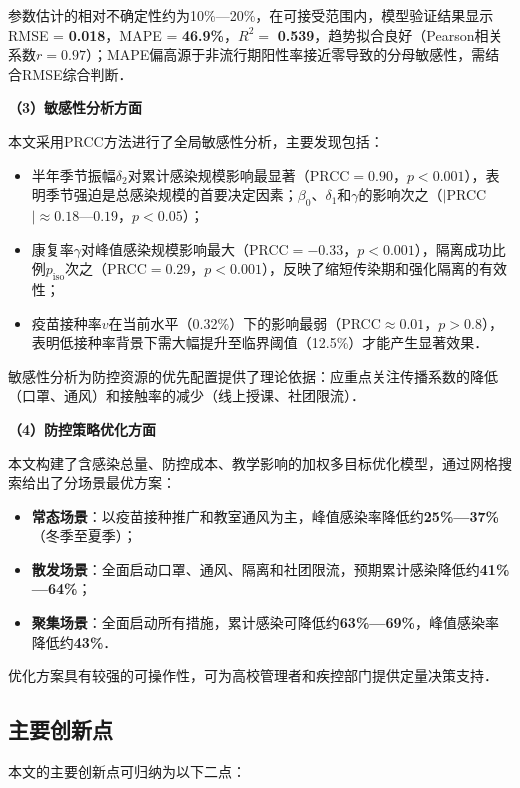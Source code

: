 参数估计的相对不确定性约为10\%—20\%，在可接受范围内，模型验证结果显示RMSE = \textbf{0.018}，MAPE = \textbf{46.9\%}，$R^2 =$ \textbf{0.539}，趋势拟合良好（Pearson相关系数$r=0.97$）；MAPE偏高源于非流行期阳性率接近零导致的分母敏感性，需结合RMSE综合判断．

\textbf{（3）敏感性分析方面}

本文采用PRCC方法进行了全局敏感性分析，主要发现包括：

\begin{itemize}
  \item 半年季节振幅$\delta_2$对累计感染规模影响最显著（PRCC$=0.90$，$p<0.001$），表明季节强迫是总感染规模的首要决定因素；$\beta_0$、$\delta_1$和$\gamma$的影响次之（$|$PRCC$|\approx0.18$—$0.19$，$p<0.05$）；
  \item 康复率$\gamma$对峰值感染规模影响最大（PRCC$=-0.33$，$p<0.001$），隔离成功比例$p_{\text{iso}}$次之（PRCC$=0.29$，$p<0.001$），反映了缩短传染期和强化隔离的有效性；
  \item 疫苗接种率$v$在当前水平（0.32\%）下的影响最弱（PRCC$\approx0.01$，$p>0.8$），表明低接种率背景下需大幅提升至临界阈值（12.5\%）才能产生显著效果．
\end{itemize}

敏感性分析为防控资源的优先配置提供了理论依据：应重点关注传播系数的降低（口罩、通风）和接触率的减少（线上授课、社团限流）．

\textbf{（4）防控策略优化方面}

本文构建了含感染总量、防控成本、教学影响的加权多目标优化模型，通过网格搜索给出了分场景最优方案：

\begin{itemize}
  \item \textbf{常态场景}：以疫苗接种推广和教室通风为主，峰值感染率降低约\textbf{25\%—37\%}（冬季至夏季）；
  \item \textbf{散发场景}：全面启动口罩、通风、隔离和社团限流，预期累计感染降低约\textbf{41\%—64\%}；
  \item \textbf{聚集场景}：全面启动所有措施，累计感染可降低约\textbf{63\%—69\%}，峰值感染率降低约\textbf{43\%}．
\end{itemize}

优化方案具有较强的可操作性，可为高校管理者和疾控部门提供定量决策支持．

\subsection{主要创新点}

本文的主要创新点可归纳为以下二点：

